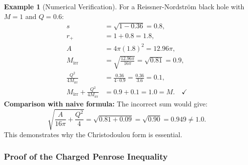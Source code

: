\documentclass[12pt]{article}
\theoremstyle{plain}
\theoremstyle{definition}
\newtheorem{example}[theorem]{Example}
\theoremstyle{remark}
\begin{document}
\begin{example}[Numerical Verification]
For a Reissner-Nordstr\"om black hole with $M = 1$ and $Q = 0.6$:
\begin{align*}
    s &= \sqrt{1 - 0.36} = 0.8, \\
    r_+ &= 1 + 0.8 = 1.8, \\
    A &= 4\pi(1.8)^2 = 12.96\pi, \\
    M_{\mathrm{irr}} &= \sqrt{\frac{12.96\pi}{16\pi}} = \sqrt{0.81} = 0.9, \\
    \frac{Q^2}{4M_{\mathrm{irr}}} &= \frac{0.36}{4 \cdot 0.9} = \frac{0.36}{3.6} = 0.1, \\
    M_{\mathrm{irr}} + \frac{Q^2}{4M_{\mathrm{irr}}} &= 0.9 + 0.1 = 1.0 = M. \quad \checkmark
\end{align*}
\textbf{Comparison with naive formula:} The incorrect sum would give:
\[
\sqrt{\frac{A}{16\pi} + \frac{Q^2}{4}} = \sqrt{0.81 + 0.09} = \sqrt{0.90} = 0.949 \neq 1.0.
\]
This demonstrates why the Christodoulou form is essential.
\end{example}

\subsubsection{Proof of the Charged Penrose Inequality}
\end{document}
